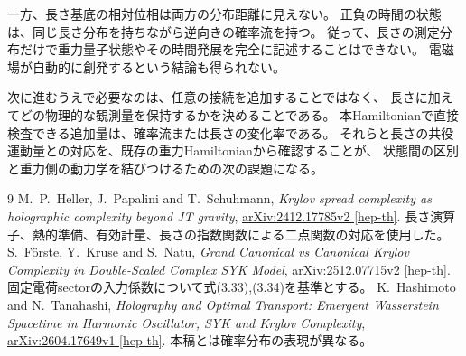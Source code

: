 \documentclass[a4paper,11pt]{ltjsarticle}
\numberwithin{equation}{section}
\begin{document}
一方、長さ基底の相対位相は両方の分布距離に見えない。
正負の時間の状態は、同じ長さ分布を持ちながら逆向きの確率流を持つ。
従って、長さの測定分布だけで重力量子状態やその時間発展を完全に記述することはできない。
電磁場が自動的に創発するという結論も得られない。

次に進むうえで必要なのは、任意の接続を追加することではなく、
長さに加えてどの物理的な観測量を保持するかを決めることである。
本Hamiltonianで直接検査できる追加量は、確率流または長さの変化率である。
それらと長さの共役運動量との対応を、既存の重力Hamiltonianから確認することが、
状態間の区別と重力側の動力学を結びつけるための次の課題になる。

\begin{thebibliography}{9}
M.~P.~Heller, J.~Papalini and T.~Schuhmann,
\emph{Krylov spread complexity as holographic complexity beyond JT gravity},
\href{https://arxiv.org/abs/2412.17785v2}{arXiv:2412.17785v2 [hep-th]}.
長さ演算子、熱的準備、有効計量、長さの指数関数による二点関数の対応を使用した。
S.~F\"orste, Y.~Kruse and S.~Natu,
\emph{Grand Canonical vs Canonical Krylov Complexity in Double-Scaled Complex SYK Model},
\href{https://arxiv.org/abs/2512.07715v2}{arXiv:2512.07715v2 [hep-th]}.
固定電荷sectorの入力係数について式(3.33),(3.34)を基準とする。
K.~Hashimoto and N.~Tanahashi,
\emph{Holography and Optimal Transport: Emergent Wasserstein Spacetime in Harmonic Oscillator, SYK and Krylov Complexity},
\href{https://arxiv.org/abs/2604.17649v1}{arXiv:2604.17649v1 [hep-th]}.
本稿とは確率分布の表現が異なる。
\end{thebibliography}
\end{document}
